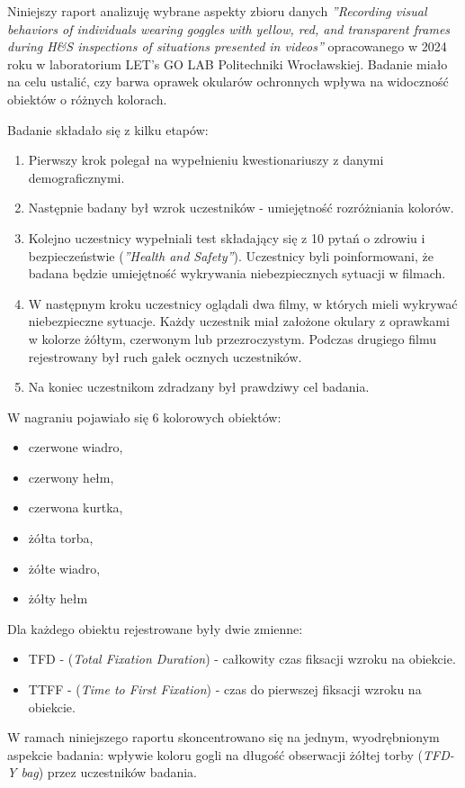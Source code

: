 Niniejszy raport analizuję wybrane aspekty zbioru danych 
\textit{''Recording visual behaviors of individuals wearing goggles with yellow, red, and transparent frames during H\&S inspections of situations presented in videos''} 
\cite{4W6TIW_2025} opracowanego w 2024 roku w laboratorium LET's GO LAB Politechniki Wrocławskiej. Badanie miało na celu ustalić,
czy barwa oprawek okularów ochronnych wpływa na widoczność obiektów o różnych kolorach. 

Badanie składało się z kilku etapów:

\begin{enumerate}
    \item Pierwszy krok polegał na wypełnieniu kwestionariuszy z danymi demograficznymi.
    \item Następnie badany był wzrok uczestników - umiejętność rozróżniania kolorów.
    \item Kolejno uczestnicy wypełniali test składający się z 10 pytań o zdrowiu i bezpieczeństwie (\textit{''Health and Safety''}). Uczestnicy byli poinformowani, że badana będzie umiejętność wykrywania niebezpiecznych sytuacji w filmach.
    \item W następnym kroku uczestnicy oglądali dwa filmy, w których mieli wykrywać niebezpieczne sytuacje. Każdy uczestnik miał założone okulary z oprawkami w kolorze żółtym, czerwonym lub przezroczystym. Podczas drugiego filmu rejestrowany był ruch gałek ocznych uczestników.
    \item Na koniec uczestnikom zdradzany był prawdziwy cel badania.
\end{enumerate}

W nagraniu pojawiało się 6 kolorowych obiektów:
\begin{itemize}
    \item czerwone wiadro,
    \item czerwony hełm,
    \item czerwona kurtka,
    \item żółta torba,
    \item żółte wiadro,
    \item żółty hełm
\end{itemize}

Dla każdego obiektu rejestrowane były dwie zmienne:
\begin{itemize}
    \item TFD - (\textit{Total Fixation Duration}) - całkowity czas fiksacji wzroku na obiekcie.
    \item TTFF - (\textit{Time to First Fixation}) - czas do pierwszej fiksacji wzroku na obiekcie.
\end{itemize}

W ramach niniejszego raportu skoncentrowano się na jednym, wyodrębnionym aspekcie badania: 
wpływie koloru gogli na długość obserwacji żółtej torby (\textit{TFD-Y bag}) przez uczestników badania.
